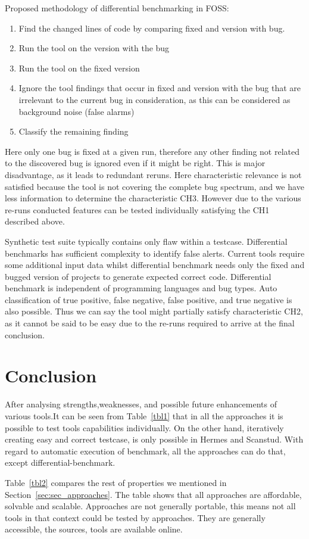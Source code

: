 \documentclass[authoryear,preprint]{sigplanconf}
\begin{document}
Proposed methodology of differential benchmarking in FOSS:
\begin{enumerate}
	\item Find the changed lines of code by comparing fixed and version with bug.
	\item Run the tool on the version with the bug
	\item Run the tool on the fixed version
	\item Ignore the tool findings that occur in fixed and version with the bug that are irrelevant to the current bug in consideration, as this can be considered as background noise (false alarms)
	\item Classify the remaining finding
\end{enumerate}

Here only one bug is fixed at a given run, therefore any other finding not related to the discovered bug is ignored even if it might be right. This is major disadvantage, as it leads to redundant reruns. Here characteristic relevance is not satisfied because the tool is not covering the complete bug spectrum, and we have less information to determine the characteristic CH3. However due to the various re-runs conducted features can be tested individually satisfying the CH1 described above.

Synthetic test suite typically contains only flaw within a testcase. Differential benchmarks has sufficient complexity to identify false alerts. Current tools require some additional input data whilst differential benchmark needs only the fixed and bugged version of projects to generate expected correct code. Differential benchmark is independent of programming languages and bug types. Auto classification of true positive, false negative, false positive, and true negative is also possible. Thus we can say the tool might partially satisfy characteristic CH2, as it cannot be said to be easy due to the re-runs required to arrive at the final conclusion.

\section{Conclusion}
\label{sec:conclusion}
After analysing strengths,weaknesses, and possible future enhancements of various tools.It can be seen from Table~\ref{tbl1} that in all the approaches it is possible to test tools capabilities individually. On the other hand, iteratively creating easy and correct testcase, is only possible in Hermes and Scanstud. With regard to automatic execution of benchmark, all the approaches can do that, except differential-benchmark.

Table~\ref{tbl2} compares the rest of properties we mentioned in Section~\ref{sec:sec_approaches}. The table shows that all approaches are affordable, solvable and scalable. Approaches are not generally portable, this means not all tools in that context could be tested by approaches. They are generally accessible, the sources, tools are available online.  
 
	
	
	
	
\end{document}
